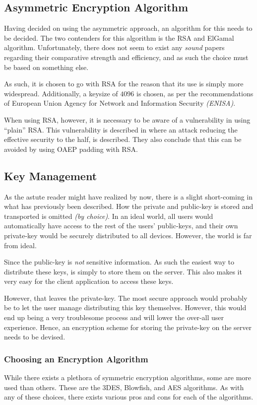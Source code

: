 		\subsection{Asymmetric Encryption Algorithm}
			Having decided on using the asymmetric approach, an algorithm for this needs to be decided. The two contenders for this algorithm is the RSA and ElGamal algorithm. Unfortunately, there does not seem to exist any \emph{sound} papers regarding their comparative strength and efficiency, and as such the choice must be based on something else.

			As such, it is chosen to go with RSA for the reason that its use is simply more widespread. Additionally, a keysize of $4096$ is chosen, as per the recommendations of European Union Agency for Network and Information Security \emph{(ENISA)}\cite[p.37]{enisa}.

			When using RSA, however, it is necessary to be aware of a vulnerability in using ``plain'' RSA. This vulnerability is described in \cite{boneh2000textbook} where an attack reducing the effective security to the half, is described. They also conclude that this can be avoided by using OAEP padding with RSA.

		\subsection{Key Management}
			\label{sec:keys}
			As the astute reader might have realized by now, there is a slight short-coming in what has previously been described. How the private and public-key is stored and transported is omitted \emph{(by choice)}. In an ideal world, all users would automatically have access to the rest of the users' public-keys, and their own private-key would be securely distributed to all devices. However, the world is far from ideal.

			Since the public-key is \emph{not} sensitive information. As such the easiest way to distribute these keys, is simply to store them on the server. This also makes it very easy for the client application to access these keys.

			However, that leaves the private-key. The most secure approach would probably be to let the user manage distributing this key themselves. However, this would end up being a very troublesome process and will lower the over-all user experience. Hence, an encryption scheme for storing the private-key on the server needs to be devised.

			\subsubsection{Choosing an Encryption Algorithm}
				While there exists a plethora of symmetric encryption algorithms, some are more used than others. These are the 3DES, Blowfish, and AES algorithms. As with any of these choices, there exists various pros and cons for each of the algorithms. 

